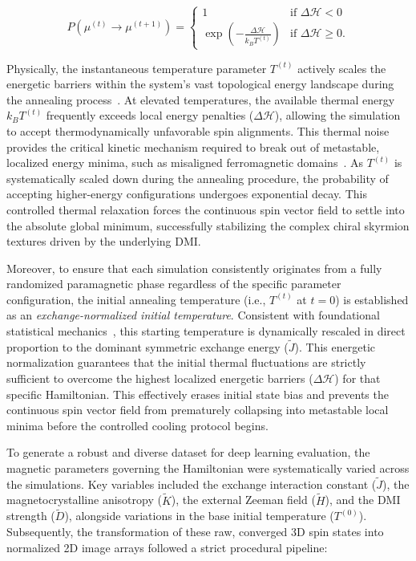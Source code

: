 \documentclass[a4paper,fleqn]{cas-sc}
\begin{document}
\begin{equation}\label{eq:Metropolis}
P(\mu^{(t)} \rightarrow \mu^{(t+1)}) = \begin{cases}
1 & \text{if } \Delta \mathcal{H} < 0 \\
\exp\left(-\frac{\Delta \mathcal{H}}{k_B T^{(t)}}\right) & \text{if } \Delta \mathcal{H} \geq 0.
\end{cases}
\end{equation}

Physically, the instantaneous temperature parameter $T^{(t)}$ actively scales the energetic barriers within the system's vast topological energy landscape during the annealing process~\cite{landau2021guide}. At elevated temperatures, the available thermal energy $k_B T^{(t)}$ frequently exceeds local energy penalties ($\Delta \mathcal{H}$), allowing the simulation to accept thermodynamically unfavorable spin alignments. This thermal noise provides the critical kinetic mechanism required to break out of metastable, localized energy minima, such as misaligned ferromagnetic domains~\cite{desplat2018thermal}. As $T^{(t)}$ is systematically scaled down during the annealing procedure, the probability of accepting higher-energy configurations undergoes exponential decay. This controlled thermal relaxation forces the continuous spin vector field to settle into the absolute global minimum, successfully stabilizing the complex chiral skyrmion textures driven by the underlying DMI.

Moreover, to ensure that each simulation consistently originates from a fully randomized paramagnetic phase regardless of the specific parameter configuration, the initial annealing temperature (i.e., $T^{(t)}$ at $t=0$) is established as an \textit{exchange-normalized initial temperature}. Consistent with foundational statistical mechanics~\cite{eriksson2017atomistic}, this starting temperature is dynamically rescaled in direct proportion to the dominant symmetric exchange energy ($\tilde{J}$). This energetic normalization guarantees that the initial thermal fluctuations are strictly sufficient to overcome the highest localized energetic barriers ($\Delta \mathcal{H}$) for that specific Hamiltonian. This effectively erases initial state bias and prevents the continuous spin vector field from prematurely collapsing into metastable local minima before the controlled cooling protocol begins.

To generate a robust and diverse dataset for deep learning evaluation, the magnetic parameters governing the Hamiltonian were systematically varied across the simulations. Key variables included the exchange interaction constant ($\tilde{J}$), the magnetocrystalline anisotropy ($\tilde{K}$), the external Zeeman field ($\tilde{H}$), and the DMI strength ($\tilde{D}$), alongside variations in the base initial temperature ($T^{(0)}$). Subsequently, the transformation of these raw, converged 3D spin states into normalized 2D image arrays followed a strict procedural pipeline:
\end{document}
